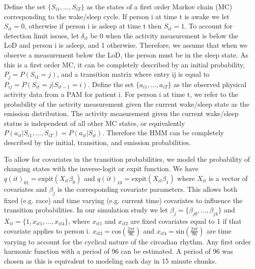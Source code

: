 \documentclass{article}
\begin{document}
Define the set $\{S_{i1}, ..., S_{iT}\}$ as the states of a first order Markov 
chain (MC) corresponding to the wake/sleep cycle. If person i at time t is awake 
we let $S_{it}=0$, otherwise if person i is asleep at time t then $S_{it}=1$. 
To account for detection limit issues, let $\delta_{it}$ be 0 when the activity 
measurement is below the LoD and person i is asleep, and 1 otherwise. Therefore, 
we assume that when we observe a measurement below the LoD, the person must be in 
the sleep state. As this is a first order MC, it can be completely described by 
an initial probability, $P_j=P(S_{i1} =j)$, and a transition matrix where entry 
ij is equal to $P_{ij}=P(S_{it}=j|S_{it-1}=i)$. Define the set $\{a_{i1}, ..., a_{iT}\}$ 
as the observed physical activity data from a PAM for patient i. For person i 
at time t, we refer to the probability of the activity measurement given the 
current wake/sleep state as the emission distribution. The activity measurement 
given the current wake/sleep status is independent of all other MC states, or 
equivalently $P(a_{it}|S_{i1}, ..., S_{iT}) = P(a_{it}|S_{it})$. Therefore the 
HMM can be completely described by the initial, transition, and emission probabilities.

To allow for covariates in the transition probabilities, we model the probability
of changing states with the inverse-logit or expit function. We have 
$q(it)_{01} = \text{expit}(X_{it}\beta_0)$ and $q(it)_{10} = \text{expit}(X_{it}\beta_1)$ 
where $X_{it}$ is a vector of covariates and $\beta_j$ is the corresponding covariate
parameters. This allows both fixed (e.g. race) and time varying (e.g. current time) 
covariates to influence the transition probabilities. In our simulation study we 
let $\beta_j = \{\beta_{j0}, ..., \beta_{j4}\}$ and $X_{it} = \{1, x_{it1}, ..., x_{it4}\}$, 
where $x_{it1}$ and $x_{it2}$ are fixed covariates equal to 1 if that covariate applies to 
person i. $x_{it3} = \text{cos}(\frac{2\pi t}{96})$ and $x_{it4} = \text{sin}(\frac{2\pi t}{96})$ 
are time varying to account for the cyclical nature of the circadian rhythm.  Any first 
order harmonic function with a period of 96 can be estimated. A period of 96 was chosen 
as this is equivalent to modeling each day in 15 minute chunks.
\end{document}
